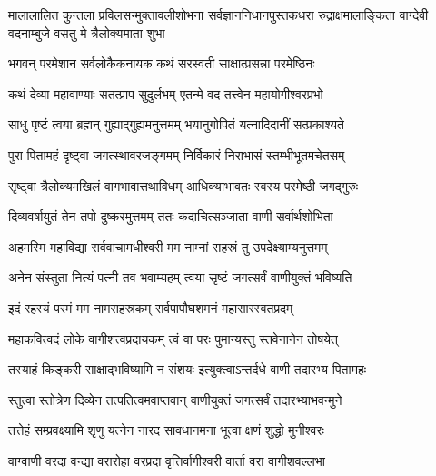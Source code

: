 
{मालालालित कुन्तला प्रविलसन्मुक्तावलीशोभना}
{सर्वज्ञाननिधानपुस्तकधरा रुद्राक्षमालाङ्किता}
{वाग्देवी वदनाम्बुजे वसतु मे त्रैलोक्यमाता शुभा}


\twolineshloka
{भगवन् परमेशान सर्वलोकैकनायक}
{कथं सरस्वती साक्षात्प्रसन्ना परमेष्ठिनः}%

\twolineshloka
{कथं देव्या महावाण्याः सतत्प्राप सुदुर्लभम्}
{एतन्मे वद तत्त्वेन महायोगीश्वरप्रभो}%



\twolineshloka
{साधु पृष्टं त्वया ब्रह्मन् गुह्याद्गुह्यमनुत्तमम्}
{भयानुगोपितं यत्नादिदानीं सत्प्रकाश्यते}%

\twolineshloka
{पुरा पितामहं दृष्ट्वा जगत्स्थावरजङ्गमम्}
{निर्विकारं निराभासं स्तम्भीभूतमचेतसम्}%

\twolineshloka
{सृष्ट्वा त्रैलोक्यमखिलं वागभावात्तथाविधम्}
{आधिक्याभावतः स्वस्य परमेष्ठी जगद्गुरुः}%

\twolineshloka
{दिव्यवर्षायुतं तेन तपो दुष्करमुत्तमम्}
{ततः कदाचित्सञ्जाता वाणी सर्वार्थशोभिता}%

\twolineshloka
{अहमस्मि महाविद्या सर्ववाचामधीश्वरी}
{मम नाम्नां सहस्रं तु उपदेक्ष्याम्यनुत्तमम्}%

\twolineshloka
{अनेन संस्तुता नित्यं पत्नी तव भवाम्यहम्}
{त्वया सृष्टं जगत्सर्वं वाणीयुक्तं भविष्यति}%

\twolineshloka
{इदं रहस्यं परमं मम नामसहस्रकम्}
{सर्वपापौघशमनं महासारस्वतप्रदम्}%

\twolineshloka
{महाकवित्वदं लोके वागीशत्वप्रदायकम्}
{त्वं वा परः पुमान्यस्तु स्तवेनानेन तोषयेत्}%

\twolineshloka
{तस्याहं किङ्करी साक्षाद्भविष्यामि न संशयः}
{इत्युक्त्वाऽन्तर्दधे वाणी तदारभ्य पितामहः}%

\twolineshloka
{स्तुत्वा स्तोत्रेण दिव्येन तत्पतित्वमवाप्तवान्}
{वाणीयुक्तं जगत्सर्वं तदारभ्याभवन्मुने}%

\twolineshloka
{तत्तेहं सम्प्रवक्ष्यामि शृणु यत्नेन नारद}
{सावधानमना भूत्वा क्षणं शुद्धो मुनीश्वरः}%




 \resetShloka


\twolineshloka
{वाग्वाणी वरदा वन्द्या वरारोहा वरप्रदा}
{वृत्तिर्वागीश्वरी वार्ता वरा वागीशवल्लभा}%

